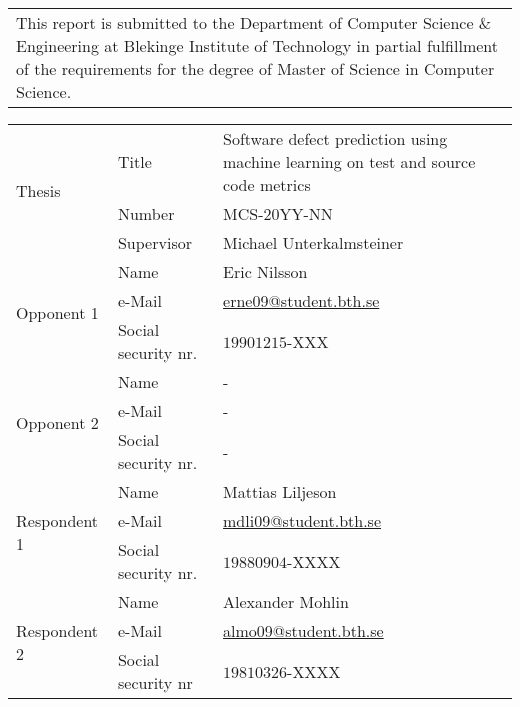 {\pagestyle{empty}
\changepage{5cm}{1cm}{-0.5cm}{-0.5cm}{}{-2cm}{}{}{}
\noindent%
\begin{tabular}{p{\textwidth}}
{\small This report is submitted to the Department of Computer Science \& Engineering at Blekinge
Institute of Technology in partial fulfillment of the requirements for the degree of Master
of Science in Computer Science.}
\end{tabular}

\par\vspace{2cm}

\noindent
\begin{tabular}{|l|l|p{10cm}|}
	\hline
	\multirow{3}{*}{Thesis}		& Title					& Software defect prediction using machine learning on test and source code metrics\\ \cline{2-3}
								& Number				& MCS-20YY-NN\\ \cline{2-3}
								& Supervisor 			& Michael Unterkalmsteiner\\ \hline  
\multirow{3}{*}{Opponent 1}		& Name                  & Eric Nilsson\\
								& e-Mail                & \href{mailto:erne09@student.bth.se}{erne09@student.bth.se}\\
								& Social security nr.	& $19901215$-XXX	\\ \hline
\multirow{3}{*}{Opponent 2} 	& Name                  & - \\ %
								& e-Mail                & - \\ %
								& Social security nr.	& - \\ \hline   
\multirow{3}{*}{Respondent 1}	& Name					& Mattias Liljeson \\ %
								& e-Mail                & \href{mailto:mdli09@student.bth.se}{mdli09@student.bth.se}\\ %
								& Social security nr.	& $19880904$-XXXX\\ \hline
 \multirow{3}{*}{Respondent 2}	& Name					& Alexander Mohlin\\ %
								& e-Mail                & \href{mailto:almo09@student.bth.se}{almo09@student.bth.se}\\ %
								& Social security nr    & $19810326$-XXXX\\ \hline
\end{tabular}

\par\vspace{2cm}

}
